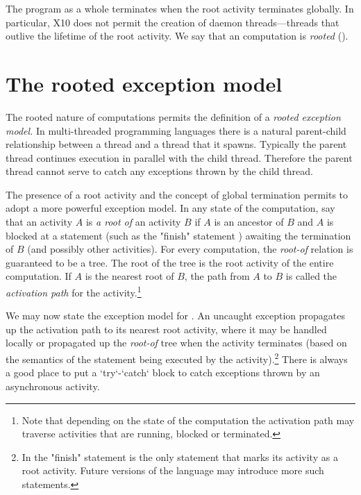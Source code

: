 The program as a whole terminates when the root activity terminates globally.
In particular, X10 does not permit the creation of 
daemon threads---threads that outlive the lifetime of the root
activity.  We say that an \Xten{} computation is {\em rooted}
().


\section{The \Xten{} rooted exception model}
\label{ExceptionModel}

The rooted nature of \Xten{} computations permits the definition of a
{\em rooted exception model.} In multi-threaded programming languages
there is a natural parent-child relationship between a thread and a
thread that it spawns. Typically the parent thread continues execution
in parallel with the child thread. Therefore the parent thread cannot
serve to catch any exceptions thrown by the child thread. 

The presence of a root activity and the concept of global termination permits
\Xten{} to adopt a more powerful exception model. In any state of the
computation, say that an activity $A$ is {\em a root of} an activity $B$ if
$A$ is an ancestor of $B$ and $A$ is blocked at a statement (such as the
\xcd"finish" statement ) awaiting the termination of $B$ (and
possibly other activities). For every \Xten{} computation, the \emph{root-of}
relation is guaranteed to be a tree. The root of the tree is the root activity
of the entire computation. If $A$ is the nearest root of $B$, the path from
$A$ to $B$ is called the {\em activation path} for the activity.\footnote{Note
  that depending on the state of the computation the activation path may
  traverse activities that are running, blocked or terminated.}

We may now state the exception model for \Xten.  An uncaught exception
propagates up the activation path to its nearest root activity, where
it may be handled locally or propagated up the \emph{root-of} tree when
the activity terminates (based on the semantics of the statement being
executed by the activity).\footnote{In \XtenCurrVer{} the \xcd"finish"
statement is the only statement that marks its activity as a root
activity. Future versions of the language may introduce more such
statements.}  
There is always a good place to put a \xcd`try`-\xcd`catch` block to catch
exceptions thrown by an asynchronous activity.

